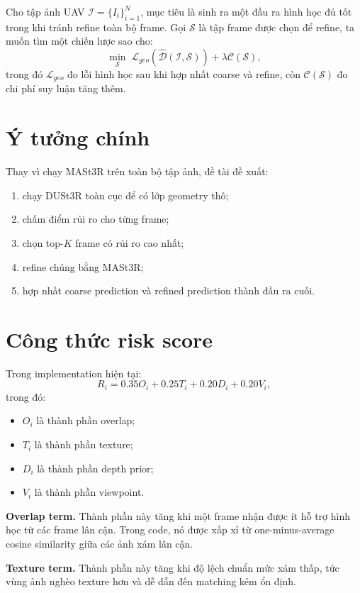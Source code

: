 \documentclass[12pt,a4paper,oneside]{report}
\begin{document}
Cho tập ảnh UAV $\mathcal{I}=\{I_i\}_{i=1}^{N}$, mục tiêu là sinh ra một đầu ra hình học đủ tốt trong khi tránh refine toàn bộ frame. Gọi $\mathcal{S}$ là tập frame được chọn để refine, ta muốn tìm một chiến lược sao cho:
\[
\min_{\mathcal{S}} \; \mathcal{L}_{geo}(\hat{\mathcal{D}}(\mathcal{I}, \mathcal{S})) + \lambda \mathcal{C}(\mathcal{S}),
\]
trong đó $\mathcal{L}_{geo}$ đo lỗi hình học sau khi hợp nhất coarse và refine, còn $\mathcal{C}(\mathcal{S})$ đo chi phí suy luận tăng thêm.

\section{Ý tưởng chính}

Thay vì chạy MASt3R trên toàn bộ tập ảnh, đề tài đề xuất:
\begin{enumerate}[leftmargin=1.5em]
  \item chạy DUSt3R toàn cục để có lớp geometry thô;
  \item chấm điểm rủi ro cho từng frame;
  \item chọn top-$K$ frame có rủi ro cao nhất;
  \item refine chúng bằng MASt3R;
  \item hợp nhất coarse prediction và refined prediction thành đầu ra cuối.
\end{enumerate}

\section{Công thức risk score}

Trong implementation hiện tại:
\[
R_i = 0.35 O_i + 0.25 T_i + 0.20 D_i + 0.20 V_i,
\]
trong đó:
\begin{itemize}[leftmargin=1.5em]
  \item $O_i$ là thành phần overlap;
  \item $T_i$ là thành phần texture;
  \item $D_i$ là thành phần depth prior;
  \item $V_i$ là thành phần viewpoint.
\end{itemize}

\textbf{Overlap term.} Thành phần này tăng khi một frame nhận được ít hỗ trợ hình học từ các frame lân cận. Trong code, nó được xấp xỉ từ one-minus-average cosine similarity giữa các ảnh xám lân cận.

\textbf{Texture term.} Thành phần này tăng khi độ lệch chuẩn mức xám thấp, tức vùng ảnh nghèo texture hơn và dễ dẫn đến matching kém ổn định.
\end{document}

